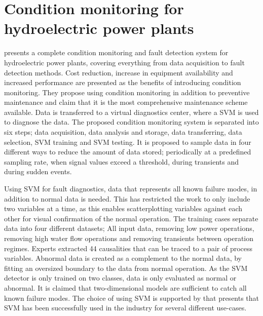    \section{Condition monitoring for hydroelectric power plants}\label{sec:cm}
        \cite{Selak2014} presents a complete condition monitoring and fault detection system for hydroelectric power plants, covering everything from data acquisition to fault detection methods. Cost reduction, increase in equipment availability and increased performance are presented as the benefits of introducing condition monitoring. They propose using condition monitoring in addition to preventive maintenance and claim that it is the most comprehensive maintenance scheme available. Data is transferred to a virtual diagnostics center, where a SVM is used to diagnose the data. The proposed condition monitoring system is separated into six steps; data acquisition, data analysis and storage, data transferring, data selection, SVM training and SVM testing. It is proposed to sample data in four different ways to reduce the amount of data stored; periodically at a predefined sampling rate, when signal values exceed a threshold, during transients and during sudden events. 
        
        Using SVM for fault diagnostics, data that represents all known failure modes, in addition to normal data is needed. This has restricted the work to only include two variables at a time, as this enables scatterplotting variables against each other for visual confirmation of the normal operation. The training cases separate data into four different datasets; All input data, removing low power operations, removing high water flow operations and removing transients between operation regimes. Experts extracted 44 causalities that can be traced to a pair of process variables. Abnormal data is created as a complement to the normal data, by fitting an oversized boundary to the data from normal operation. As the SVM detector is only trained on two classes, data is only evaluated as normal or abnormal. It is claimed that two-dimensional models are sufficient to catch all known failure modes. The choice of using SVM is supported by \cite{Widodo2007} that presents that SVM has been successfully used in the industry for several different use-cases. 
        
